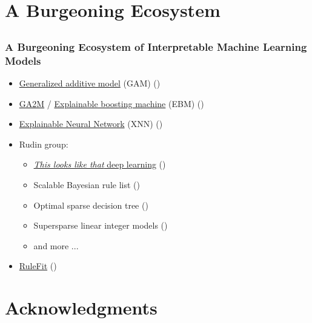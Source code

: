 \documentclass[11pt,aspectratio=169,hyperref={colorlinks}]{beamer}
\begin{document}
	\section{A Burgeoning Ecosystem}
			
		\subsection*{}
		
		\begin{frame}
		
			\frametitle{A Burgeoning Ecosystem of Interpretable Machine Learning Models}		
			
			\begin{itemize}
				\item \href{https://www.r-bloggers.com/generalized-additive-models}{Generalized additive model} (GAM) (\cite{esl})
				\item \href{http://www.cs.cornell.edu/~yinlou/projects/gam/}{GA2M} / \href{https://github.com/interpretml/interpret/}{Explainable boosting machine} (EBM) (\cite{ga2m})
				\item \href{https://www.mdpi.com/2078-2489/11/3/137}{Explainable Neural Network} (XNN) (\cite{wf_xnn})
				\item Rudin group: 
				\begin{itemize}
					\item \href{https://www.youtube.com/watch?v=k3IQnRsl9U4}{\textit{This looks like that} deep learning} (\cite{this_looks_like_that})
					\item Scalable Bayesian rule list (\cite{sbrl}) 
					\item Optimal sparse decision tree (\cite{osdt})
					\item Supersparse linear integer models (\cite{slim})
					\item and more ... 
				\end{itemize}
				\item \href{https://christophm.github.io/interpretable-ml-book/rulefit.html}{RuleFit} (\cite{rulefit})
			\end{itemize}
		
		\end{frame}
		
\section{Acknowledgments}
\end{document}
